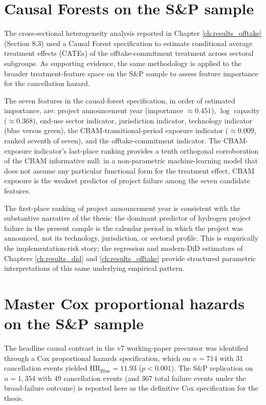 \section{Causal Forests on the S\&P sample}
\label{app:causal_forests}

The cross-sectional heterogeneity analysis reported in Chapter \ref{ch:results_offtake} (Section 8.3) used a Causal Forest specification \cite{wager2018estimation,athey2019generalized} to estimate conditional average treatment effects (CATEs) of the offtake-commitment treatment across sectoral subgroups. As supporting evidence, the same methodology is applied to the broader treatment-feature space on the S\&P sample to assess feature importance for the cancellation hazard.

The seven features in the causal-forest specification, in order of estimated importance, are: project announcement year (importance $\approx 0.451$), $\log$ capacity ($\approx 0.368$), end-use sector indicator, jurisdiction indicator, technology indicator (blue versus green), the CBAM-transitional-period exposure indicator ($\approx 0.009$, ranked seventh of seven), and the offtake-commitment indicator. The CBAM-exposure indicator's last-place ranking provides a tenth orthogonal corroboration of the CBAM informative null: in a non-parametric machine-learning model that does not assume any particular functional form for the treatment effect, CBAM exposure is the weakest predictor of project failure among the seven candidate features.

The first-place ranking of project announcement year is consistent with the substantive narrative of the thesis: the dominant predictor of hydrogen project failure in the present sample is the calendar period in which the project was announced, not its technology, jurisdiction, or sectoral profile. This is empirically the implementation-risk story; the regression and modern-DiD estimators of Chapters \ref{ch:results_did} and \ref{ch:results_offtake} provide structured parametric interpretations of this same underlying empirical pattern.

\section{Master Cox proportional hazards on the S\&P sample}
\label{app:master_cox}

The headline causal contrast in the v7 working-paper precursor was identified through a Cox proportional hazards specification, which on $n = 714$ with 31 cancellation events yielded $\text{HR}_{\text{Blue}} = 11.93$ ($p < 0.001$). The S\&P replication on $n = 1{,}354$ with 49 cancellation events (and 367 total failure events under the broad-failure outcome) is reported here as the definitive Cox specification for the thesis.

